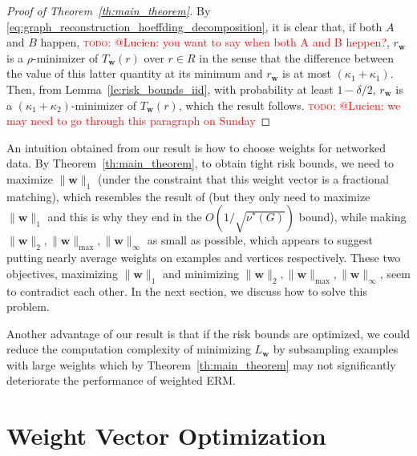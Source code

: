 \documentclass[letterpaper]{article} %
\def\LongVersion{}
\def\LongVersionEnd{}
\newcommand{\weight}{\mathbf{w}}
\newcommand{\empiricalrisk}[1]{L_{#1}}
\newcommand{\normo}[1]{\|#1\|_1}
\newcommand{\red}[1]{\textcolor{red}{#1}}
\newcommand{\todo}[1]{\red{\textsc{todo:} #1}}
\begin{document}
\begin{proof}[Proof of Theorem~\ref{th:main_theorem}]
    By \eqref{eq:graph_reconstruction_hoeffding_decomposition}, it is clear that, if both $A$ and $B$ happen,
    \todo{@Lucien: you want to say when both A and B heppen?}, 
    $r_\weight{}$ is a $\rho$-minimizer of $T_\weight{}(r)$ over $r\in R$ in the sense that the difference between the value of this latter quantity at its minimum and $r_\weight{}$ is at most $(\kappa_1+\kappa_1)$.
    Then, from Lemma~\ref{le:risk_bounds_iid}, with probability at least $1-\delta/2$, $r_\weight{}$ is a $(\kappa_1+\kappa_2)$-minimizer of $T_\weight{}(r)$, which the result follows. \todo{@Lucien: we may need to go through this paragraph on Sunday}
\end{proof}

An intuition obtained from our result is how to choose weights for networked data. By Theorem~\ref{th:main_theorem}, to obtain tight risk bounds, we need to maximize $\normo{\weight{}}$ (under the constraint that this weight vector is a fractional matching), which resembles the result of \cite{wang2017learning} (but they only need to maximize $\normo{\weight{}}$ and this is why they end in the $O(1/\sqrt{\nu^*(G)})$ bound), while making $\|\weight{}\|_2,\|\weight{}\|_\max,\|\weight{}\|_\infty$ as small as possible, which appears to suggest putting nearly average weights on examples and vertices respectively. These two objectives, maximizing $\normo{\weight{}}$ and minimizing $\|\weight{}\|_2,\|\weight{}\|_\max,\|\weight{}\|_\infty$, seem to contradict each other. 
In the next section, we discuss how to solve this problem.  


\LongVersion
Another advantage of our result is that if the risk bounds are optimized, we could reduce the computation complexity of minimizing $\empiricalrisk{\weight{}}$ by subsampling examples with large weights which by Theorem~\ref{th:main_theorem} may not significantly deteriorate the performance of weighted ERM.
\LongVersionEnd

\section{Weight Vector Optimization} %
\label{sec:weighting_scheme}
\end{document}
